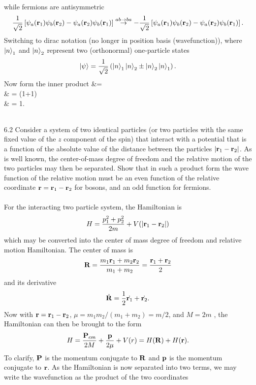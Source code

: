 \documentclass[10pt,letterpaper]{article}
\begin{document}
	while fermions are antisymmetric
	\[
		\frac{1}{\sqrt 2}\left[
		\psi_a(\mathbf{r}_1)\psi_b(\mathbf{r}_2)- \psi_a(\mathbf{r}_2)\psi_b(\mathbf{r}_1)\right] \overset{ab\to ba}\to
		-\frac{1}{\sqrt 2}\left[\psi_a(\mathbf{r}_1)\psi_b(\mathbf{r}_2)- \psi_a(\mathbf{r}_2)\psi_b(\mathbf{r}_1)\right].
	\]
	Switching to dirac notation (no longer in position basis (wavefunction)), where $\ket n_1$ and $\ket n_2$ represent two    		(orthonormal) one-particle states
	\[
		\ket{\psi} = \frac{1}{\sqrt 2}\left( \ket n_1\ket n_2 \pm \ket n_2\ket n_1\right).
	\]
	Now form the inner product
	\ba
		\braket{\psi|\psi} &=  \\
		& = (1\pm0+1) \\
		& = 1.
	\ea
	\\ \\
	\item[6.2]
	Consider a system of two identical particles (or two particles with the same fixed value of the $z$ component of the 
	spin) that interact with a potential that is a function of the absolute value of the distance between the particles
	$|\mathbf{r}_1-\mathbf{r}_2|$. As is well known, the center-of-mass degree of freedom and the relative motion of the 
	two particles may then be separated. Show that in such a product form the wave function of the relative motion
	must be an even function of the relative coordinate $\mathbf{r}= \mathbf{r}_1-\mathbf{r}_2$ for bosons, and an odd 
	function for fermions. 
	\\ \\
	For the interacting two particle system, the Hamiltonian is
	\[
		H = \frac{p_1^2+p_2^2}{2m}+V(|\mathbf{r}_1-\mathbf{r}_2|)
	\]
	which may be converted into the center of mass degree of freedom and relative motion Hamiltonian. The center of mass 
	is
	\[
		\mathbf{R} = \frac{m_1\mathbf{r}_1+m_2\mathbf{r}_2}{m_1+m_2} = \frac{\mathbf{r}_1+\mathbf{r}_2}{2}
	\]
	and its derivative
	\[
			\dot{\mathbf{R}} = \frac{1}{2} \dot{\mathbf{r}_1}+\dot{\mathbf{r}_2}.
	\]
	Now with $\mathbf{r} = \mathbf{r}_1-\mathbf{r}_2$, $\mu = m_1m_2/(m_1+m_2) = m/2$, and $M = 2m$ , the Hamiltonian
	can then be brought to the form
	\[
		H = \frac{\mathbf{P}_{cm}}{2M}+\frac{\mathbf{p}}{2\mu} + V (r) = H(\mathbf{R}) + H(\mathbf{r}).
	\]
	To clarify, $\mathbf{P}$ is the momentum conjugate to $\mathbf{R}$ and $\mathbf{p}$ is the momentum conjugate to $\mathbf{r}$. As 		the Hamiltonian is now separated into two terms, we may write the wavefunction as the product of the two coordinates
\end{document}
